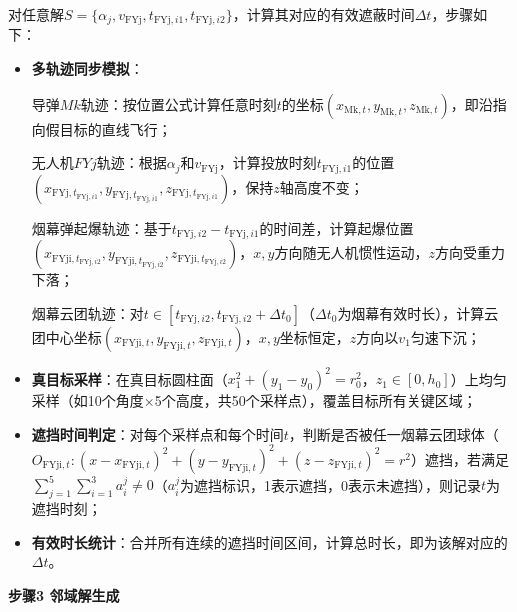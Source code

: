 \documentclass[../main.tex]{subfiles}
\begin{document}
对任意解$S=\{\alpha_j, v_{\text{FYj}}, t_{\text{FYj},i1}, t_{\text{FYj},i2}\}$，计算其对应的有效遮蔽时间$\Delta t$，步骤如下：
\begin{itemize}
\item \textbf{多轨迹同步模拟}：

导弹$Mk$轨迹：按位置公式计算任意时刻$t$的坐标$(x_{\text{Mk},t}, y_{\text{Mk},t}, z_{\text{Mk},t})$，即沿指向假目标的直线飞行；

无人机$FYj$轨迹：根据$\alpha_j$和$v_{\text{FYj}}$，计算投放时刻$t_{\text{FYj},i1}$的位置$(x_{\text{FYj},t_{\text{FYj},i1}}, y_{\text{FYj},t_{\text{FYj},i1}}, z_{\text{FYj},t_{\text{FYj},i1}})$，保持$z$轴高度不变；

烟幕弹起爆轨迹：基于$t_{\text{FYj},i2} - t_{\text{FYj},i1}$的时间差，计算起爆位置$(x_{\text{FYji},t_{\text{FYj},i2}}, y_{\text{FYji},t_{\text{FYj},i2}}, z_{\text{FYji},t_{\text{FYj},i2}})$，$x,y$方向随无人机惯性运动，$z$方向受重力下落；

烟幕云团轨迹：对$t \in [t_{\text{FYj},i2}, t_{\text{FYj},i2}+\Delta t_0]$（$\Delta t_0$为烟幕有效时长），计算云团中心坐标$(x_{\text{FYji},t}, y_{\text{FYji},t}, z_{\text{FYji},t})$，$x,y$坐标恒定，$z$方向以$v_1$匀速下沉；
\item \textbf{真目标采样}：在真目标圆柱面（$x_1^2+(y_1-y_0)^2=r_0^2$，$z_1 \in [0,h_0]$）上均匀采样（如10个角度×5个高度，共50个采样点），覆盖目标所有关键区域；
\item \textbf{遮挡时间判定}：对每个采样点和每个时间$t$，判断是否被任一烟幕云团球体（$O_{\text{FYji},t}: (x-x_{\text{FYji},t})^2+(y-y_{\text{FYji},t})^2+(z-z_{\text{FYji},t})^2=r^2$）遮挡，若满足$\sum_{j=1}^5\sum_{i=1}^3 a_i^j \neq 0$（$a_i^j$为遮挡标识，1表示遮挡，0表示未遮挡），则记录$t$为遮挡时刻；
\item \textbf{有效时长统计}：合并所有连续的遮挡时间区间，计算总时长，即为该解对应的$\Delta t$。
\end{itemize}

\noindent\textbf{步骤3 邻域解生成}
\end{document}
